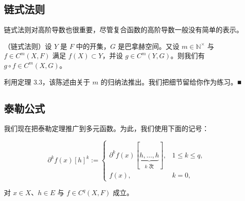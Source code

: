 \subsection*{链式法则}

链式法则对高阶导数也很重要，尽管复合函数的高阶导数一般没有简单的表示。

\begin{theorem}

（链式法则）设 $ Y $ 是 $ F $ 中的开集，$ G $ 是巴拿赫空间。又设 $ m \in \mathbb{N}^{\times} $ 与 $ f \in C^{m}(X, F) $ 满足 $ f(X) \subset Y $，并设 $ g \in C^{m}(Y, G) $。则我们有 $ g \circ f \in C^{m}(X, G) $。

\proofhead
利用定理 3.3，该陈述由关于 $ m $ 的归纳法推出。我们把细节留给你作为练习。\nobreak\hspace{0.35em}■
\end{theorem}

\subsection*{泰勒公式}

我们现在把泰勒定理推广到多元函数。为此，我们使用下面的记号：

\begin{equation*}
\partial^{k}f(x)[h]^{k} := \begin{cases} \partial^{k}f(x)[\underbrace{h, \ldots, h}_{k\text{ 次}}] , & 1 \le k \le q , \\ f(x) , & k = 0 , \end{cases}
\end{equation*}

对 $ x \in X $、$ h \in E $ 与 $ f \in C^{q}(X, F) $ 成立。

